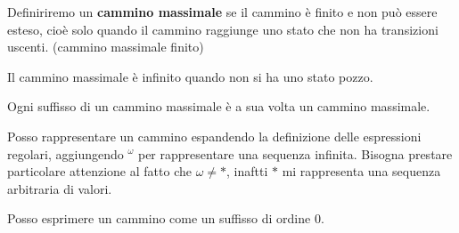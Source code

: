 \begin{definizione}
    Definiriremo un \textbf{cammino massimale} se il cammino è finito e non può
    essere esteso, cioè solo quando il cammino raggiunge uno stato che non ha
    transizioni uscenti. (cammino massimale finito)
\end{definizione}
Il cammino massimale è infinito quando non si ha uno stato pozzo.
\begin{nota}
    Ogni suffisso di un cammino massimale è a sua volta un cammino massimale.
\end{nota}
Posso rappresentare un cammino espandendo la definizione delle espressioni regolari,
aggiungendo $^\omega$ per rappresentare una sequenza infinita. Bisogna prestare
particolare attenzione al fatto che $\omega \neq \ast$, inaftti $\ast$ mi rappresenta
una sequenza arbitraria di valori.
\begin{nota}
    Posso esprimere un cammino come un suffisso di ordine 0.
\end{nota}
